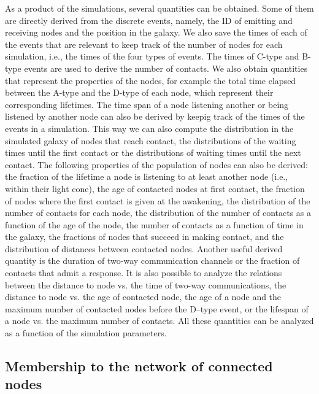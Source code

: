 \documentclass[crop]{CSLB}
\newcommand{\ceti}{node}
\newcommand{\cetis}{nodes}
\begin{document}
As a product of the simulations, several quantities can be obtained.
%
Some of them are directly derived from the discrete events, namely,
the ID of emitting and receiving \cetis{} and the position in the
galaxy.
%
We also save the times of each of the events that are relevant to keep
track of the number of \cetis{} for each simulation, i.e., the times
of the four types of events.
%
The times of C-type and B-type events are used to derive the number of
contacts.
%
We also obtain quantities that represent the properties of the
\cetis{}, for example the total time elapsed between the A-type and
the D-type of each node, which represent their corresponding
lifetimes.
%
The time span of a \ceti{} listening another or being listened by
another node can also be derived by keepig track of the times of the
events in a simulation.
%
This way we can also compute the distribution in the simulated galaxy
of \cetis{} that reach contact, the distributions of the waiting times
until the first contact or the distributions of waiting times until
the next contact.
%
The following properties of the population of \cetis{} can also be
derived:
%
the fraction of the lifetime a node is listening to at least another
node (i.e., within their light cone), the age of contacted \cetis{} at
first contact, the fraction of \cetis{} where the first contact is
given at the awakening, the distribution of the number of contacts for
each \ceti{}, the distribution of the number of contacts as a function
of the age of the node, the number of contacts as a function of time
in the galaxy, the fractions of nodes that succeed in making contact,
and the distribution of distances between contacted nodes.
%
Another useful derived quantity is the duration of two-way
communication channels or the fraction of contacts that admit a
response.
% 
It is also possible to analyze the relations between the distance to
\ceti{} vs. the time of two-way communications, the distance to
\ceti{} vs. the age of contacted node, the age of a node and the
maximum number of contacted nodes before the D--type event, or the
lifespan of a node vs. the maximum number of contacts.
%
All these quantities can be analyzed as a function of the simulation
parameters.




\subsection{Membership to the network of connected \cetis{}}\label{SS_members}
\end{document}
